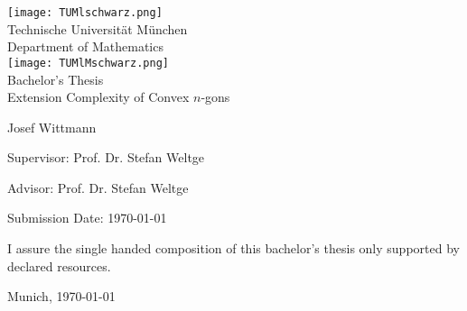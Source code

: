 \begin{titlepage}
\begin{center}
\texttt{[image: TUMlschwarz.png]}\\[3mm]
\sf
{\Large
  Technische Universität München\\[5mm]
  Department of Mathematics\\[8mm]
}
\normalsize
\texttt{[image: TUMlMschwarz.png]}\\[15mm]

Bachelor's Thesis\\[15mm]

{\Huge
  Extension Complexity of Convex $n$-gons
}
\bigskip

\normalsize

Josef Wittmann
\end{center}
\vspace*{75mm}

Supervisor: Prof. Dr. Stefan Weltge
\medskip

Advisor: Prof. Dr. Stefan Weltge
\medskip

Submission Date: \today

\end{titlepage}

\vspace*{150mm}

I assure the single handed composition of this bachelor's thesis only supported by declared resources.
\bigskip

Munich, \today
\newpage
